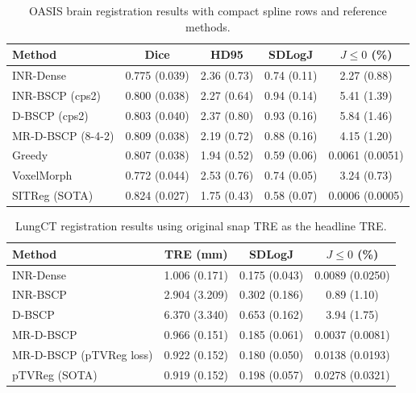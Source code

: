 \begin{table}[t]
\centering
\caption{OASIS brain registration results with compact spline rows and reference methods.}
\label{tab:oasis20-publication-main-with-references}
\begin{tabular}{lcccc}
\toprule
Method & Dice & HD95 & SDLogJ & $J\leq 0$ (\%) \\
\midrule
INR-Dense & 0.775 (0.039) & 2.36 (0.73) & 0.74 (0.11) & 2.27 (0.88) \\
INR-BSCP (cps2) & 0.800 (0.038) & 2.27 (0.64) & 0.94 (0.14) & 5.41 (1.39) \\
D-BSCP (cps2) & 0.803 (0.040) & 2.37 (0.80) & 0.93 (0.16) & 5.84 (1.46) \\
MR-D-BSCP (8-4-2) & 0.809 (0.038) & 2.19 (0.72) & 0.88 (0.16) & 4.15 (1.20) \\
Greedy & 0.807 (0.038) & 1.94 (0.52) & 0.59 (0.06) & 0.0061 (0.0051) \\
VoxelMorph & 0.772 (0.044) & 2.53 (0.76) & 0.74 (0.05) & 3.24 (0.73) \\
SITReg (SOTA) & 0.824 (0.027) & 1.75 (0.43) & 0.58 (0.07) & 0.0006 (0.0005) \\
\bottomrule
\end{tabular}
\end{table}

\begin{table}[t]
\centering
\caption{LungCT registration results using original snap TRE as the headline TRE.}
\label{tab:lungct10-publication}
\begin{tabular}{lccc}
\toprule
Method & TRE (mm) & SDLogJ & $J\leq 0$ (\%) \\
\midrule
INR-Dense & 1.006 (0.171) & 0.175 (0.043) & 0.0089 (0.0250) \\
INR-BSCP & 2.904 (3.209) & 0.302 (0.186) & 0.89 (1.10) \\
D-BSCP & 6.370 (3.340) & 0.653 (0.162) & 3.94 (1.75) \\
MR-D-BSCP & 0.966 (0.151) & 0.185 (0.061) & 0.0037 (0.0081) \\
MR-D-BSCP (pTVReg loss) & 0.922 (0.152) & 0.180 (0.050) & 0.0138 (0.0193) \\
pTVReg (SOTA) & 0.919 (0.152) & 0.198 (0.057) & 0.0278 (0.0321) \\
\bottomrule
\end{tabular}
\end{table}

